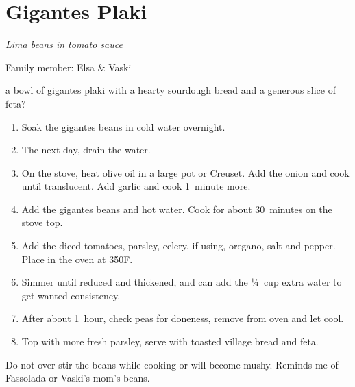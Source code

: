 \chapter{Gigantes Plaki}
\label{ch:gigantes-plaki}


\textit{Lima beans in tomato sauce}

Family member: Elsa \& Vaski


 a bowl of gigantes plaki with a hearty sourdough bread and a generous slice of feta?

\bigskip

\begin{enumerate}
    \item Soak the gigantes beans in cold water overnight.
    \item The next day, drain the water.
    \item On the stove, heat olive oil in a large pot or Creuset. Add the onion and cook until translucent. Add garlic and cook 1~minute more.
    \item Add the gigantes beans and hot water. Cook for about 30~minutes on the stove top.
    \item Add the diced tomatoes, parsley, celery, if using, oregano, salt and pepper. Place in the oven at 350\degree F.
    \item Simmer until reduced and thickened, and can add the ¼~cup extra water to get wanted consistency.
    \item After about 1~hour, check peas for doneness, remove from oven and let cool.
    \item Top with more fresh parsley, serve with toasted village bread and feta.
\end{enumerate}

Do not over-stir the beans while cooking or will become mushy.
Reminds me of Fassolada or Vaski's mom's beans.
